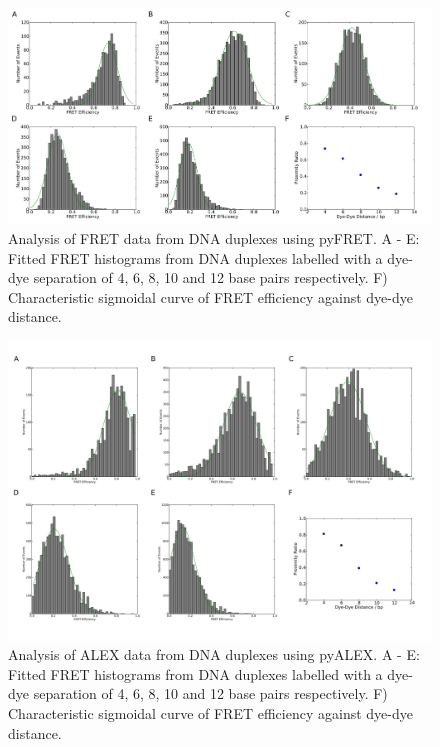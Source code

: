 \begin{figure}[!ht]
   \begin{center}
      \includegraphics*[clip=true, width=6.5in]{pyFRET/FRET_AND.pdf}
      \caption{Analysis of FRET data from DNA duplexes using pyFRET. A - E: Fitted FRET histograms from DNA duplexes labelled with a dye-dye separation of 4, 6, 8, 10 and 12 base pairs respectively. F) Characteristic sigmoidal curve of FRET efficiency against dye-dye distance.}
      \label{fig:fig4_AND_plots}
   \end{center}
\end{figure}

\begin{figure}[!ht]
   \begin{center}
      \includegraphics*[clip=true, width=6.5in]{pyFRET/FRET_ALEX.pdf}
      \caption{Analysis of ALEX data from DNA duplexes using pyALEX. A - E: Fitted FRET histograms from DNA duplexes labelled with a dye-dye separation of 4, 6, 8, 10 and 12 base pairs respectively. F) Characteristic sigmoidal curve of FRET efficiency against dye-dye distance.}
      \label{fig:fig5_ALEX_plots}
   \end{center}
\end{figure}


